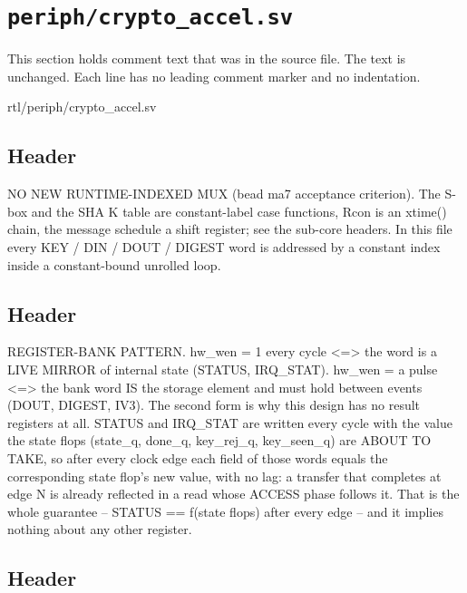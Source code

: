 \section{\texttt{periph/crypto\_accel.sv}}\label{tm:mod:crypto-accel}

This section holds comment text that was in the source file. The text is unchanged. Each line has no leading comment marker and no indentation.

\begin{relocated}{rtl/periph/crypto_accel.sv}

\subsection*{Header}

\begin{textblock}
NO NEW RUNTIME-INDEXED MUX (bead ma7 acceptance criterion). The S-box and the SHA K table are
constant-label case functions, Rcon is an xtime() chain, the message schedule a shift register;
see the sub-core headers. In this file every KEY / DIN / DOUT / DIGEST word is addressed by a
constant index inside a constant-bound unrolled loop.
\end{textblock}

\subsection*{Header}

\begin{textblock}
REGISTER-BANK PATTERN. hw_wen = 1 every cycle <=> the word is a LIVE MIRROR of internal state
(STATUS, IRQ_STAT). hw_wen = a pulse <=> the bank word IS the storage element and must hold
between events (DOUT, DIGEST, IV3). The second form is why this design has no result registers
at all. STATUS and IRQ_STAT are written every cycle with the value the state flops (state_q,
done_q, key_rej_q, key_seen_q) are ABOUT TO TAKE, so after every clock edge each field of those
words equals the corresponding state flop's new value, with no lag: a transfer that completes at
edge N is already reflected in a read whose ACCESS phase follows it. That is the whole guarantee
-- STATUS == f(state flops) after every edge -- and it implies nothing about any other register.
\end{textblock}

\subsection*{Header}


\end{relocated}

